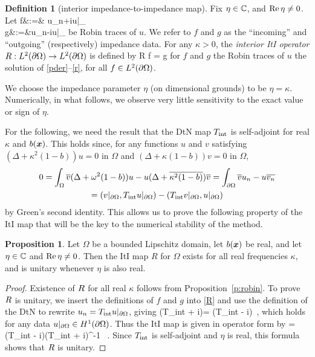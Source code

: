 \documentclass[11pt,final]{amsart}
\theoremstyle{definition}
\numberwithin{remark}{section}
\newtheorem{definition}{Definition}
\numberwithin{definition}{section}
\newtheorem{pro}{Proposition}
\numberwithin{pro}{section}
\begin{document}
\begin{definition}[interior impedance-to-impedance map]
Fix $\eta\in\mathbb{C}$, and $\operatorname{Re} \eta\neq 0$. Let
\bea
f&:=& u_n+i\eta u|_\pO
\label{f}
\\
g&:=&u_n-i\eta u|_\pO
\label{g}
\eea
be Robin traces of $u$. We refer to $f$ and $g$ as the ``incoming'' and ``outgoing'' (respectively)
impedance data.
For any $\kappa>0$, the \emph{interior ItI operator} $R:L^2({\partial\Omega})\to L^2({\partial\Omega})$ is defined by
\be
R f = g
\label{R}
\ee
for $f$ and $g$ the Robin traces of $u$ the solution of \eqref{pder}--\eqref{r},
for all $f \in L^2({\partial\Omega})$.
\end{definition}
We choose the impedance parameter $\eta$ (on dimensional grounds)
to be $\eta = \kappa$.  Numerically, in what follows,
we observe very little sensitivity to the exact value or sign of $\eta$.

For the following, we need the result that
the DtN map $T_{\rm int}$ is self-adjoint for real $\kappa$ and $b(\bm{x})$.
This holds since, for any functions $u$ and $v$ satisfying
$(\Delta + \kappa^2(1-b))u = 0$ in $\Omega$ and $(\Delta + \kappa(1-b))v = 0$
in $\Omega$,
\begin{multline*}
0= \int_\Omega \overline{v} (\Delta+\omega^2(1-b))u - u(\Delta+\overline{\kappa^2(1-b)})\overline{v} = \int_{\partial\Omega} \overline{v}u_n - u\overline{v_n}\\
= (v|_{\partial\Omega},T_{\rm int} u|_{\partial\Omega}) - (T_{\rm int} v|_{\partial\Omega}, u|_{\partial\Omega})
\end{multline*}
by Green's second identity.
This allows us to prove the following property of the ItI map that will be
the key to the numerical stability of the method.

\begin{pro} Let $\Omega$ be a bounded Lipschitz domain, let $b(\bm{x})$ be real,
and let $\eta\in\mathbb{C}$ and $\operatorname{Re} \eta\neq 0$.
Then the ItI map $R$ for $\Omega$ exists for all real frequencies $\kappa$,
and is unitary whenever $\eta$ is also real.
\end{pro}
\begin{proof}
Existence of $R$ for all real $\kappa$ follows from Proposition~\ref{p:robin}.
To prove $R$ is unitary, we insert the definitions of $f$ and $g$ into
\eqref{R} and use the definition of the DtN to rewrite $u_n = T_{\rm int} u|_{\partial\Omega}$,
giving
\be
\iti(T_{\rm int} + i\eta)\ub = (T_{\rm int} - i\eta)\ub~,
\label{eq:ItI}
\ee
which holds for any data $u|_{\partial\Omega}\in H^1({\partial\Omega})$.
Thus the ItI map is given in operator form by
\be
\iti = (T_{\rm int} - i\eta)(T_{\rm int} + i\eta)^{-1}
~.
\label{itidtn}
\ee
Since $T_{\rm int}$ is self-adjoint and $\eta$ is real, this formula shows
that $R$ is unitary.
\end{proof}
\end{document}
